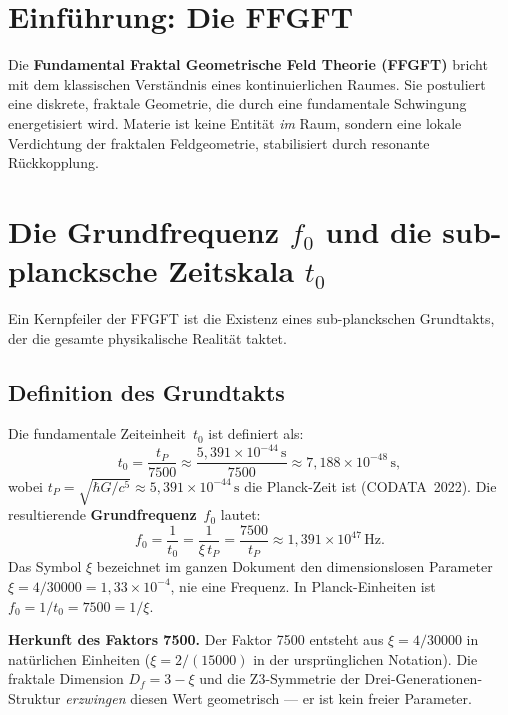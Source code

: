 \section{Einführung: Die FFGFT}

Die \textbf{Fundamental Fraktal Geometrische Feld Theorie (FFGFT)} bricht mit
dem klassischen Verständnis eines kontinuierlichen Raumes. Sie postuliert eine
diskrete, fraktale Geometrie, die durch eine fundamentale Schwingung energetisiert
wird. Materie ist keine Entität \emph{im} Raum, sondern eine lokale Verdichtung
der fraktalen Feldgeometrie, stabilisiert durch resonante Rückkopplung.

\section{Die Grundfrequenz $f_0$ und die sub-plancksche Zeitskala $t_0$}

Ein Kernpfeiler der FFGFT ist die Existenz eines sub-planckschen Grundtakts,
der die gesamte physikalische Realität taktet.

\subsection{Definition des Grundtakts}

Die fundamentale Zeiteinheit~$t_0$ ist definiert als:
\begin{equation}
  t_0 = \frac{t_P}{7500}
      \approx \frac{5{,}391 \times 10^{-44}\,\text{s}}{7500}
      \approx 7{,}188 \times 10^{-48}\,\text{s},
  \label{eq:t0}
\end{equation}
wobei $t_P = \sqrt{\hbar G/c^5} \approx 5{,}391 \times 10^{-44}\,\text{s}$
die Planck-Zeit ist (CODATA~2022). Die resultierende \textbf{Grundfrequenz}~$f_0$ lautet:
\begin{equation}
  f_0 = \frac{1}{t_0} = \frac{1}{\xi\,t_P} = \frac{7500}{t_P}
      \approx 1{,}391 \times 10^{47}\,\text{Hz}.
  \label{eq:xi}
\end{equation}
Das Symbol $\xi$ bezeichnet im ganzen Dokument den dimensionslosen
Parameter $\xi = 4/30000 = 1{,}33\times 10^{-4}$, nie eine Frequenz.
In Planck-Einheiten ist $f_0 = 1/t_0 = 7500 = 1/\xi$.

\begin{keybox}
\textbf{Herkunft des Faktors 7500.}\;
Der Faktor 7500 entsteht aus $\xi = 4/30000$ in natürlichen Einheiten
($\xi = 2/(15000)$ in der ursprünglichen Notation). Die fraktale Dimension
$D_f = 3 - \xi$ und die Z3-Symmetrie der Drei-Generationen-Struktur
\emph{erzwingen} diesen Wert geometrisch — er ist kein freier Parameter.
\end{keybox}

